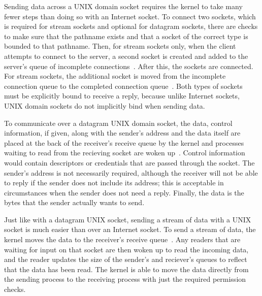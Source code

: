 Sending data across a UNIX domain socket requires the kernel to take many fewer steps than doing so with an Internet socket.  To connect two sockets, which is required for stream sockets and optional for datagram sockets, there are checks to make sure that the pathname exists and that a socket of the correct type is bounded to that pathname.  Then, for stream sockets only, when the client attempts to connect to the server, a second socket is created and added to the server's queue of incomplete connections~\cite[p 240--245]{Stevens:1996:TIT:233130}.  After this, the sockets are connected.  For stream sockets, the additional socket is moved from the incomplete connection queue to the completed connection queue~\cite[p 245--249]{Stevens:1996:TIT:233130}.  Both types of sockets must be explicitly bound to receive a reply, because unlike Internet sockets, UNIX domain sockets do not implicitly bind when sending data.

To communicate over a datagram UNIX domain socket, the data, control information, if given, along with the sender's address and the data itself are placed at the back of the receiver's receive queue by the kernel and processes waiting to read from the recieving socket are woken up~\cite[p 263--265]{Stevens:1996:TIT:233130}.  Control information would contain descriptors or credentials that are passed through the socket.  The sender's address is not necessarily required, although the receiver will not be able to reply if the sender does not include its address; this is acceptable in circumstances when the sender does not need a reply.  Finally, the data is the bytes that the sender actually wants to send.

Just like with a datagram UNIX socket, sending a stream of data with a UNIX socket is much easier than over an Internet socket.  To send a stream of data, the kernel moves the data to the receiver's receive queue~\cite[p 265--268]{Stevens:1996:TIT:233130}.  Any readers that are waiting for input on that socket are then woken up to read the incoming data, and the reader updates the size of the sender's and reciever's queues to reflect that the data has been read.  The kernel is able to move the data directly from the sending process to the receiving process with just the required permission checks.

